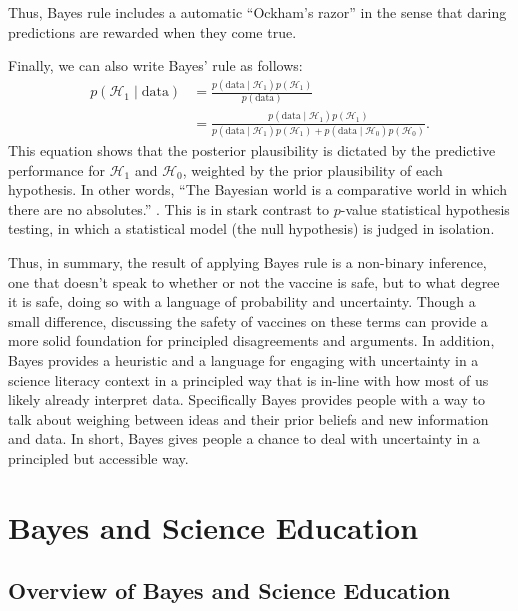 \documentclass[man]{apa7}
\begin{document}
Thus, Bayes rule includes a automatic ``Ockham's razor'' \parencite{Jeffreys1939,JefferysBerger1992} in the sense that daring predictions are rewarded when they come true.

Finally, we can also write Bayes' rule as follows:
\begin{equation}
\begin{split}
    p(\mathcal{H}_1 \mid \text{data})& = \frac{p(\text{data} \mid \mathcal{H}_1) p(\mathcal{H}_1)}{p(\text{data})}\\
    & = \frac{p(\text{data} \mid \mathcal{H}_1) p(\mathcal{H}_1)}{p(\text{data} \mid \mathcal{H}_1) p(\mathcal{H}_1) + p(\text{data} \mid \mathcal{H}_0) p(\mathcal{H}_0)}.
\end{split}
\end{equation}
This equation shows that the posterior plausibility is dictated by the predictive performance for $\mathcal{H}_1$ and $\mathcal{H}_0$, weighted by the prior plausibility of each hypothesis. In other words, ``The Bayesian world is a comparative world in which there are no absolutes.'' \parencite[p. 308]{Lindley2000}. This is in stark contrast to $p$-value statistical hypothesis testing, in which a statistical model (the null hypothesis) is judged in isolation. 

Thus, in summary, the result of applying Bayes rule is a non-binary inference, one that doesn't speak to whether or not the vaccine is safe, but to what degree it is safe, doing so with a language of probability and uncertainty. Though a small difference, discussing the safety of vaccines on these terms can provide a more solid foundation for principled disagreements and arguments. In addition, Bayes provides a heuristic and a language for engaging with uncertainty in a science literacy context in a principled way that is in-line with how most of us likely already interpret data. Specifically Bayes provides people with a way to talk about weighing between ideas and their prior beliefs and new information and data. In short, Bayes gives people a chance to deal with uncertainty in a principled but accessible way.

\section{Bayes and Science Education}

\subsection{Overview of Bayes and Science Education}
\end{document}
